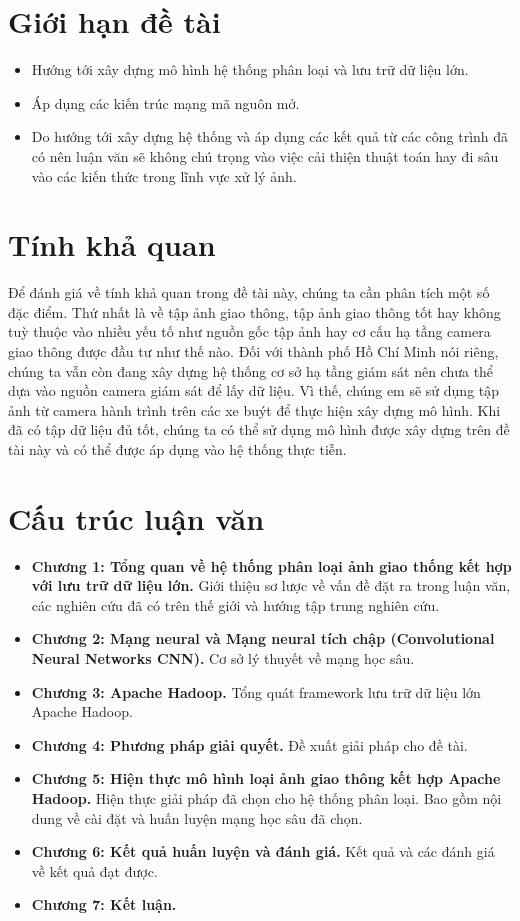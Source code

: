 \section*{Giới hạn đề tài}
\begin{itemize}
	\item Hướng tới xây dựng mô hình hệ thống phân loại và lưu trữ dữ liệu lớn.
	\item Áp dụng các kiến trúc mạng mã nguôn mở.
	\item Do hướng tới xây dựng hệ thống và áp dụng các kết quả từ các công trình đã có nên luận văn sẽ không chú trọng vào việc cải thiện thuật toán hay đi sâu vào các kiến thức trong lĩnh vực xử lý ảnh.
\end{itemize}

\section*{Tính khả quan}
	Để đánh giá về tính khả quan trong đề tài này, chúng ta cần phân tích một số đặc điểm. Thứ nhất là về tập ảnh giao thông, tập ảnh giao thông tốt hay không tuỳ thuộc vào nhiều yếu tố như nguồn gốc tập ảnh hay cơ cấu hạ tầng camera giao thông được đầu tư như thế nào. Đối với thành phố Hồ Chí Minh nói riêng, chúng ta vẫn còn đang xây dựng hệ thống cơ sở hạ tầng giám sát nên chưa thể dựa vào nguồn camera giám sát để lấy dữ liệu. Vì thế, chúng em sẽ sử dụng tập ảnh từ camera hành trình trên các xe buýt để thực hiện xây dựng mô hình. Khi đã có tập dữ liệu đủ tốt, chúng ta có thể sử dụng mô hình được xây dựng trên đề tài này và có thể được áp dụng vào hệ thống thực tiễn.

\section*{Cấu trúc luận văn}
\begin{itemize}
	\item \textbf{Chương 1: Tổng quan về hệ thống phân loại ảnh giao thống kết hợp với lưu trữ dữ liệu lớn.} Giới thiệu sơ lược về vấn đề đặt ra trong luận văn, các nghiên cứu đã có trên thế giới và hướng tập trung nghiên cứu.
	\item \textbf{Chương 2: Mạng neural và Mạng neural tích chập (Convolutional Neural Networks CNN).} Cơ sở lý thuyết về mạng học sâu.
	\item \textbf{Chương 3: Apache Hadoop.} Tổng quát framework lưu trữ dữ liệu lớn Apache Hadoop.
	\item \textbf{Chương 4: Phương pháp giải quyết.} Đề xuất giải pháp cho đề tài.
	\item \textbf{Chương 5: Hiện thực mô hình loại ảnh giao thông kết hợp Apache Hadoop. }Hiện thực giải pháp đã chọn cho hệ thống phân loại. Bao gồm nội dung về cài đặt và huấn luyện mạng học sâu đã chọn.
	\item \textbf{Chương 6: Kết quả huấn luyện và đánh giá.} Kết quả và các đánh giá về kết quả đạt được.
	\item \textbf{Chương 7: Kết luận.}
\end{itemize}